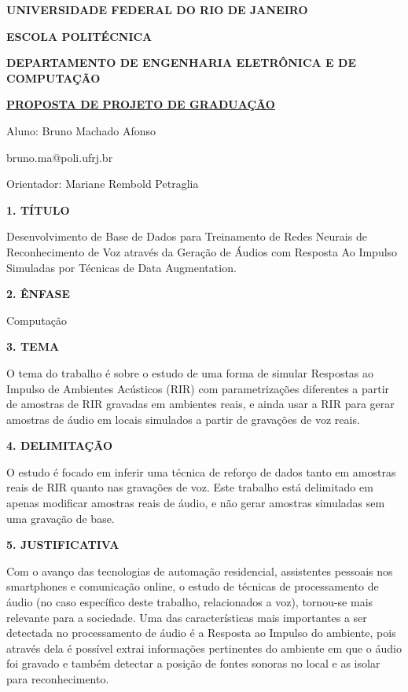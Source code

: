 \documentclass[a4paper,12pt,oneside,openany]{report}
\begin{document}
\begin{center}
\textbf{UNIVERSIDADE FEDERAL DO RIO DE JANEIRO}
\vspace{-0.2cm}

\textbf{ESCOLA POLITÉCNICA}
\vspace{-0.2cm}

\textbf{DEPARTAMENTO DE ENGENHARIA ELETRÔNICA E DE COMPUTAÇÃO}
\vspace{0.8cm}

\underline{\textbf{PROPOSTA DE PROJETO DE GRADUAÇÃO}}

Aluno: Bruno Machado Afonso
\vspace{-0.2cm}

bruno.ma@poli.ufrj.br

Orientador: Mariane Rembold Petraglia
\end{center}

\textbf{1. TÍTULO}

Desenvolvimento de Base de Dados para Treinamento de Redes Neurais de Reconhecimento de Voz através da Geração de Áudios com Resposta
Ao Impulso Simuladas por Técnicas de Data Augmentation.

\vspace{0.4cm}
\textbf{2. ÊNFASE}

Computação

\vspace{0.4cm}
\textbf{3. TEMA}

O tema do trabalho é sobre o estudo de uma forma de simular Respostas ao Impulso de Ambientes Acústicos (RIR) com parametrizações diferentes a partir de amostras 
de RIR gravadas em ambientes reais, e ainda usar a RIR para gerar amostras de áudio em locais simulados a partir de gravações de voz reais.

\vspace{0.4cm}
\textbf{4. DELIMITAÇÃO}

O estudo é focado em inferir uma técnica de reforço de dados tanto em amostras reais de RIR quanto nas gravações de voz. Este trabalho está delimitado em apenas 
modificar amostras reais de áudio, e não gerar amostras simuladas sem uma gravação de base.

\vspace{0.4cm}
\textbf{5. JUSTIFICATIVA}


Com o avanço das tecnologias de automação residencial, assistentes pessoais nos smartphones e comunicação online, o estudo de técnicas de
processamento de áudio (no caso específico deste trabalho, relacionados a voz), tornou-se mais relevante para a sociedade.
Uma das características mais importantes a ser detectada no processamento de áudio é a Resposta ao Impulso do ambiente, pois através dela é possível
extrai informações pertinentes do ambiente em que o áudio foi gravado e também detectar a posição de fontes sonoras no local e as isolar para reconhecimento.
\end{document}
